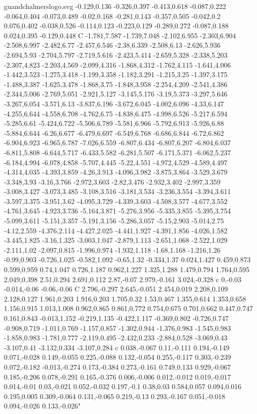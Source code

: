 \begin{filecontents}[noheader]{guandchalmerslogo.svg}
-0.129,0.136 -0.326,0.397 -0.413,0.618 -0.087,0.222 -0.064,0.404 -0.073,0.489 -0.02,0.168 -0.281,0.143 -0.357,0.505 -0.042,0.2 0.076,0.402 -0.038,0.526 -0.114,0.123 -0.223,0.129 -0.289,0.272 -0.087,0.188 0.024,0.395 -0.129,0.448 C -1.781,7.587 -1.739,7.048 -2.102,6.955 -2.303,6.904 -2.508,6.997 -2.482,6.77 -2.457,6.546 -2.38,6.339 -2.508,6.13 -2.626,5.936 -2.694,5.93 -2.704,5.797 -2.719,5.616 -2.423,5.414 -2.659,5.328 -2.338,5.203 -2.307,4.823 -2.203,4.569 -2.099,4.316 -1.868,4.312 -1.762,4.115 -1.641,4.006 -1.442,3.523 -1.275,3.418 -1.199,3.358 -1.182,3.291 -1.215,3.25 -1.397,3.175 -1.488,3.387 -1.625,3.478 -1.868,3.75 -1.848,3.958 -2.254,4.209 -2.541,4.386 -2.344,5.006 -2.769,5.051 -2.921,5.127 -3.145,5.176 -3.19,5.373 -3.297,5.646 -3.267,6.054 -3.571,6.13 -3.837,6.196 -3.672,6.045 -4.002,6.096 -4.33,6.147 -4.255,6.644 -4.558,6.708 -4.762,6.75 -4.838,6.475 -4.998,6.526 -5.217,6.594 -5.285,6.61 -5.424,6.722 -5.506,6.789 -5.581,6.966 -5.792,6.913 -5.926,6.88 -5.884,6.644 -6.26,6.677 -6.479,6.697 -6.549,6.768 -6.686,6.844 -6.72,6.862 -6.904,6.923 -6.965,6.787 -7.026,6.559 -6.807,6.434 -6.807,6.207 -6.804,6.037 -6.811,5.808 -6.644,5.717 -6.433,5.582 -6.281,5.507 -6.171,5.371 -6.062,5.237 -6.184,4.994 -6.078,4.858 -5.707,4.445 -5.22,4.551 -4.972,4.529 -4.589,4.497 -4.314,4.035 -4.393,3.859 -4.26,3.913 -4.096,3.982 -3.875,3.864 -3.529,3.679 -3.348,3.93 -3.16,3.766 -2.972,3.603 -2.82,3.476 -2.932,3.402 -2.997,3.359 -3.008,3.427 -3.073,3.485 -3.108,3.516 -3.181,3.534 -3.236,3.554 -3.394,3.611 -3.597,3.375 -3.951,3.62 -4.095,3.729 -4.339,3.603 -4.508,3.577 -4.677,3.552 -4.761,3.645 -4.923,3.736 -5.164,3.871 -5.276,3.956 -5.335,3.855 -5.395,3.754 -5.099,3.611 -5.151,3.357 -5.191,3.156 -5.286,3.057 -5.15,2.903 -5.014,2.75 -4.12,2.559 -4.376,2.114 -4.427,2.025 -4.441,1.927 -4.391,1.856 -4.026,1.582 -3.445,1.825 -3.16,1.325 -3.003,1.047 -2.879,1.113 -2.651,1.068 -2.522,1.029 -2.111,1.02 -2.097,0.815 -1.996,0.974 -1.932,1.118 -1.68,1.168 -1.216,1.26 -0.99,0.903 -0.726,1.025 -0.582,1.092 -0.65,1.32 -0.334,1.37 0.024,1.427 0.459,0.873 0.599,0.959 0.74,1.047 0.726,1.187 0.962,1.227 1.325,1.288 1.479,0.794 1.764,0.595 2.049,0.398 2.51,0.294 2.691,0.112 2.87,-0.07 2.979,-0.161 3.024,-0.328 c 0,-0.03 -0.014,-0.06 -0.06,-0.06 C 2.796,-0.297 2.645,-0.051 2.454,0.019 2.208,0.109 2.128,0.127 1.961,0.203 1.916,0.203 1.705,0.32 1.53,0.467 1.355,0.614 1.353,0.658 1.156,0.915 1.013,1.008 0.962,0.865 0.861,0.772 0.754,0.675 0.701,0.662 0.447,0.747 0.161,0.843 -0.013,1.152 -0.219,1.135 -0.422,1.117 -0.369,0.802 -0.726,0.747 -0.908,0.719 -1.011,0.769 -1.157,0.857 -1.302,0.944 -1.376,0.983 -1.545,0.983 -1.858,0.983 -1.781,0.777 -2.119,0.495 -2.432,0.233 -2.884,0.528 -3.069,0.43 -3.107,0.41 -3.132,0.334 -3.107,0.284 c 0.038,-0.067 0.11,-0.111 0.194,-0.149 0.071,-0.028 0.149,-0.055 0.225,-0.088 0.132,-0.054 0.255,-0.117 0.303,-0.239 0.072,-0.182 -0.013,-0.274 0.173,-0.384 0.273,-0.161 0.749,0.133 0.929,-0.067 0.185,-0.206 0.078,-0.291 0.165,-0.376 0.006,-0.006 0.012,-0.012 0.019,-0.017 0.014,-0.01 0.03,-0.021 0.052,-0.032 0.197,-0.1 0.38,0.03 0.584,0.057 0.094,0.016 0.195,0.005 0.309,-0.064 0.131,-0.065 0.219,-0.13 0.293,-0.167 0.051,-0.018 0.094,-0.026 0.133,-0.026"

\end{filecontents}
